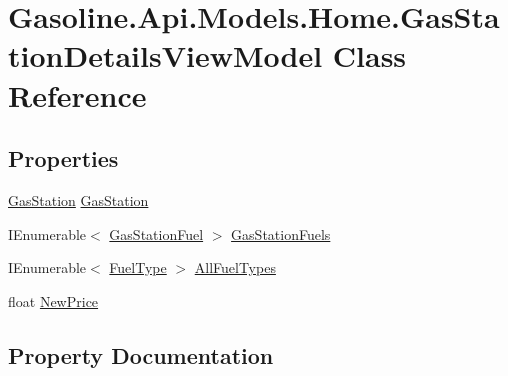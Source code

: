 \hypertarget{class_gasoline_1_1_api_1_1_models_1_1_home_1_1_gas_station_details_view_model}{}\section{Gasoline.\+Api.\+Models.\+Home.\+Gas\+Station\+Details\+View\+Model Class Reference}
\label{class_gasoline_1_1_api_1_1_models_1_1_home_1_1_gas_station_details_view_model}
\subsection*{Properties}
\begin{DoxyCompactItemize}
\item 
\mbox{\hyperlink{class_gasoline_1_1_data_1_1_models_1_1_gas_station}{Gas\+Station}} \mbox{\hyperlink{class_gasoline_1_1_api_1_1_models_1_1_home_1_1_gas_station_details_view_model_af5d00b8c689ab016369b3f961b7b4d40}{Gas\+Station}}
\item 
I\+Enumerable$<$ \mbox{\hyperlink{class_gasoline_1_1_data_1_1_models_1_1_gas_station_fuel}{Gas\+Station\+Fuel}} $>$ \mbox{\hyperlink{class_gasoline_1_1_api_1_1_models_1_1_home_1_1_gas_station_details_view_model_acd86e99c33e47cb176fa165a96399cdf}{Gas\+Station\+Fuels}}
\item 
I\+Enumerable$<$ \mbox{\hyperlink{class_gasoline_1_1_data_1_1_models_1_1_fuel_type}{Fuel\+Type}} $>$ \mbox{\hyperlink{class_gasoline_1_1_api_1_1_models_1_1_home_1_1_gas_station_details_view_model_a2b1d8e51e75bc2787f5f4cdd3b74ef95}{All\+Fuel\+Types}}
\item 
float \mbox{\hyperlink{class_gasoline_1_1_api_1_1_models_1_1_home_1_1_gas_station_details_view_model_a43fb2fd03fe8d2fd917f36028e7ea3bc}{New\+Price}}
\end{DoxyCompactItemize}


\subsection{Property Documentation}
\mbox{\label{class_gasoline_1_1_api_1_1_models_1_1_home_1_1_gas_station_details_view_model_a2b1d8e51e75bc2787f5f4cdd3b74ef95}} 
